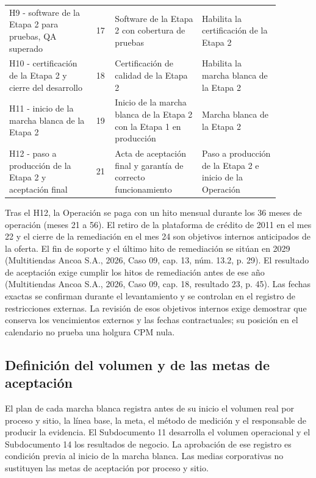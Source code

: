\documentclass[11pt]{article}
\begin{document}
\begin{longtable}{@{}p{0.290\linewidth}p{0.048\linewidth}p{0.290\linewidth}p{0.251\linewidth}@{}}
H9 - software de la Etapa 2 para pruebas, QA superado & 17 & Software de la Etapa 2 con cobertura de pruebas & Habilita la certificación de la Etapa 2 \\
H10 - certificación de la Etapa 2 y cierre del desarrollo & 18 & Certificación de calidad de la Etapa 2 & Habilita la marcha blanca de la Etapa 2 \\
H11 - inicio de la marcha blanca de la Etapa 2 & 19 & Inicio de la marcha blanca de la Etapa 2 con la Etapa 1 en producción & Marcha blanca de la Etapa 2 \\
H12 - paso a producción de la Etapa 2 y aceptación final & 21 & Acta de aceptación final y garantía de correcto funcionamiento & Paso a producción de la Etapa 2 e inicio de la Operación \\
\end{longtable}

Tras el H12, la Operación se paga con un hito mensual durante los 36 meses de operación (meses 21 a 56). El retiro de la plataforma de crédito de 2011 en el mes 22 y el cierre de la remediación en el mes 24 son objetivos internos anticipados de la oferta. El fin de soporte y el último hito de remediación se sitúan en 2029 (Multitiendas Ancoa S.A., 2026, Caso 09, cap. 13, núm. 13.2, p. 29). El resultado de aceptación exige cumplir los hitos de remediación antes de ese año (Multitiendas Ancoa S.A., 2026, Caso 09, cap. 18, resultado 23, p. 45). Las fechas exactas se confirman durante el levantamiento y se controlan en el registro de restricciones externas. La revisión de esos objetivos internos exige demostrar que conserva los vencimientos externos y las fechas contractuales; su posición en el calendario no prueba una holgura CPM nula.

\subsection*{Definición del volumen y de las metas de aceptación}

El plan de cada marcha blanca registra antes de su inicio el volumen real por proceso y sitio, la línea base, la meta, el método de medición y el responsable de producir la evidencia. El Subdocumento 11 desarrolla el volumen operacional y el Subdocumento 14 los resultados de negocio. La aprobación de ese registro es condición previa al inicio de la marcha blanca. Las medias corporativas no sustituyen las metas de aceptación por proceso y sitio.
\end{document}
